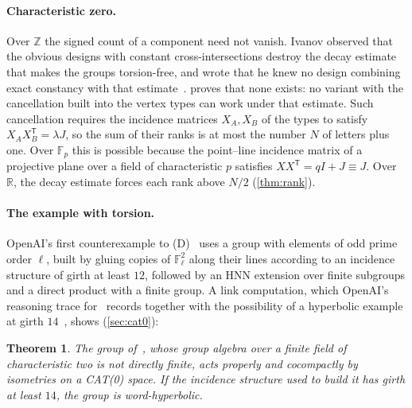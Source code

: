 \documentclass[11pt]{article}
\newtheorem{theorem}{Theorem}
\theoremstyle{definition}
\theoremstyle{plain}
\newcommand{\F}{\mathbb{F}}
\newcommand{\Z}{\mathbb{Z}}
\newcommand{\R}{\mathbb{R}}
\begin{document}
\paragraph{Characteristic zero.} Over $\Z$ the signed count of a component need not vanish. Ivanov observed that the obvious designs with constant cross-intersections destroy the decay estimate that makes the groups torsion-free, and wrote that he knew no design combining exact constancy with that estimate~\cite[\S8.2]{Ivanov2026}.  proves that none exists: no variant with the cancellation built into the vertex types can work under that estimate. Such cancellation requires the incidence matrices $X_A,X_B$ of the types to satisfy $X_AX_B^{\mathsf T}=\lambda J$, so the sum of their ranks is at most the number $N$ of letters plus one. Over $\F_p$ this is possible because the point--line incidence matrix of a projective plane over a field of characteristic $p$ satisfies $XX^{\mathsf T}=qI+J\equiv J$. Over $\R$, the decay estimate forces each rank above $N/2$ (\cref{thm:rank}).

\paragraph{The example with torsion.} OpenAI's first counterexample to (D)~\cite{OAI197b} uses a group with elements of odd prime order $\ell$, built by gluing copies of $\F_\ell^2$ along their lines according to an incidence structure of girth at least $12$, followed by an HNN extension over finite subgroups and a direct product with a finite group. A link computation, which OpenAI's reasoning trace for~\cite{OAI197b} records together with the possibility of a hyperbolic example at girth $14$~\cite[\S\S12, 17 and~21]{OAItrace}, shows (\cref{sec:cat0}):

\begin{theorem}\label{thm:F}
The group of~\cite[Thm.~1.1]{OAI197b}, whose group algebra over a finite field of characteristic two is not directly finite, acts properly and cocompactly by isometries on a CAT(0) space. If the incidence structure used to build it has girth at least $14$, the group is word-hyperbolic.
\end{theorem}
\end{document}
